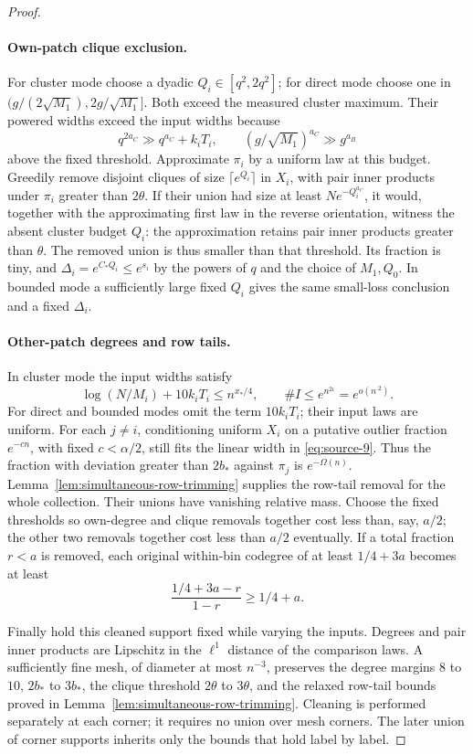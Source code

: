 \begin{proof}
\paragraph{Own-patch clique exclusion.}
For cluster mode choose a dyadic \(Q_i\in[q^2,2q^2]\); for direct mode choose one in \((g/(2\sqrt{M_1}),2g/\sqrt{M_1}]\). Both exceed the measured cluster maximum. Their powered widths exceed the input widths because
\[
 q^{2a_C}\gg q^{a_C}+k_iT_i,
 \qquad (g/\sqrt{M_1})^{a_C}\gg g^{a_B}
\]
above the fixed threshold. Approximate \(\pi_i\) by a uniform law at this budget. Greedily remove disjoint cliques of size \(\lceil e^{Q_i}\rceil\) in \(X_i\), with pair inner products under \(\pi_i\) greater than \(2\theta\). If their union had size at least \(Ne^{-Q_i^{a_C}}\), it would, together with the approximating first law in the reverse orientation, witness the absent cluster budget \(Q_i\): the approximation retains pair inner products greater than \(\theta\). The removed union is thus smaller than that threshold. Its fraction is tiny, and \(\Delta_i=e^{C_*Q_i}\le e^{s_i}\) by the powers of \(q\) and the choice of \(M_1,Q_0\). In bounded mode a sufficiently large fixed \(Q_i\) gives the same small-loss conclusion and a fixed \(\Delta_i\).

\paragraph{Other-patch degrees and row tails.}
In cluster mode the input widths satisfy
\[
 \log(N/M_i)+10k_iT_i\le n^{x_*/4},
 \qquad \#I\le e^{n^{2\iota}}=e^{o(n^{.2})}.
\]
For direct and bounded modes omit the term \(10k_iT_i\); their input laws are uniform. For each \(j\ne i\), conditioning uniform \(X_i\) on a putative outlier fraction \(e^{-cn}\), with fixed \(c<\alpha/2\), still fits the linear width in \eqref{eq:source-9}. Thus the fraction with deviation greater than \(2b_*\) against \(\pi_j\) is \(e^{-\Omega(n)}\). Lemma~\ref{lem:simultaneous-row-trimming} supplies the row-tail removal for the whole collection. Their unions have vanishing relative mass. Choose the fixed thresholds so own-degree and clique removals together cost less than, say, \(a/2\); the other two removals together cost less than \(a/2\) eventually. If a total fraction \(r<a\) is removed, each original within-bin codegree of at least \(1/4+3a\) becomes at least
\[
 \frac{1/4+3a-r}{1-r}\ge1/4+a.
\]

Finally hold this cleaned support fixed while varying the inputs. Degrees and pair inner products are Lipschitz in the \(\ell^1\) distance of the comparison laws. A sufficiently fine mesh, of diameter at most \(n^{-3}\), preserves the degree margins \(8\) to \(10\), \(2b_*\) to \(3b_*\), the clique threshold \(2\theta\) to \(3\theta\), and the relaxed row-tail bounds proved in Lemma~\ref{lem:simultaneous-row-trimming}. Cleaning is performed separately at each corner; it requires no union over mesh corners. The later union of corner supports inherits only the bounds that hold label by label.
\end{proof}


